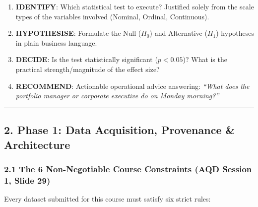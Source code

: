 \documentclass[
]{article}
\providecommand{\tightlist}{%
  \setlength{\itemsep}{0pt}\setlength{\parskip}{0pt}}
\begin{document}
\begin{enumerate}
\def\labelenumi{\arabic{enumi}.}
\tightlist
\item
  \textbf{IDENTIFY}: Which statistical test to execute? Justified solely
  from the scale types of the variables involved (Nominal, Ordinal,
  Continuous).
\item
  \textbf{HYPOTHESISE}: Formulate the Null (\(H_0\)) and Alternative
  (\(H_1\)) hypotheses in plain business language.
\item
  \textbf{DECIDE}: Is the test statistically significant (\(p < 0.05\))?
  What is the practical strength/magnitude of the effect size?
\item
  \textbf{RECOMMEND}: Actionable operational advice answering:
  \emph{``What does the portfolio manager or corporate executive do on
  Monday morning?''}
\end{enumerate}

\begin{center}\rule{0.5\linewidth}{0.5pt}\end{center}

\subsection{2. Phase 1: Data Acquisition, Provenance \&
Architecture}\label{phase-1-data-acquisition-provenance-architecture}

\subsubsection{2.1 The 6 Non-Negotiable Course Constraints (AQD Session
1, Slide
29)}\label{the-6-non-negotiable-course-constraints-aqd-session-1-slide-29}

Every dataset submitted for this course must satisfy six strict rules:
\end{document}
